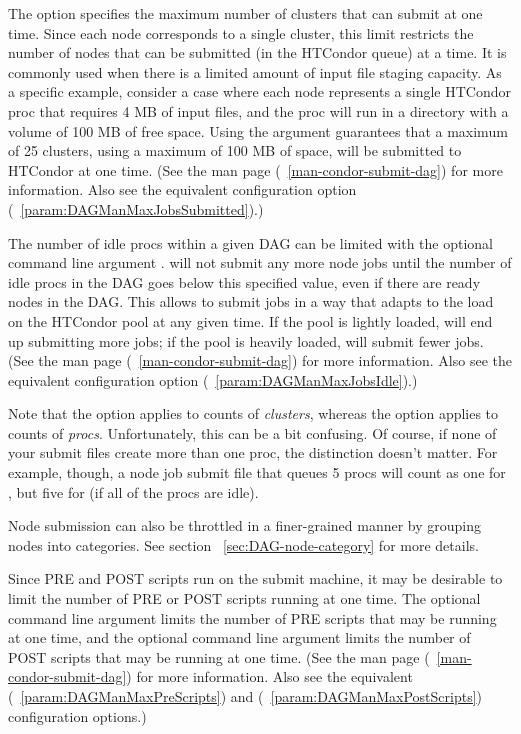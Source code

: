 The  option 
specifies the maximum number of clusters that 
can submit at one time.
Since each node corresponds to a single cluster,
this limit restricts the number of nodes that can be submitted (in the
HTCondor queue) at a time.
It is commonly used when
there is a limited amount of input file staging capacity.
As a specific example, consider a case where each node represents
a single HTCondor proc that requires 4 MB of input files,
and the proc will run in a directory with a volume of 100 MB
of free space.
Using the argument  guarantees that a maximum
of 25 clusters, using a maximum of 100 MB of space,
will be submitted to HTCondor at one time.
(See the  man page (~\ref{man-condor-submit-dag})
for more information.  Also see the equivalent
 configuration option
(~\ref{param:DAGManMaxJobsSubmitted}).)

The number of idle procs within a given DAG can be limited with
the optional command line argument . 
 will not submit any more node jobs 
until the number of idle procs in the DAG goes below this
specified value,
even if there are ready nodes in the DAG.
This allows  to submit jobs in a way that adapts to
the load on the HTCondor pool at any given time.  If the pool is
lightly loaded,  will end up submitting more jobs;
if the pool is heavily loaded,  will submit fewer jobs.
(See the  man page (~\ref{man-condor-submit-dag})
for more information.  Also see the equivalent
 configuration option
(~\ref{param:DAGManMaxJobsIdle}).)

Note that the  option applies to counts of
\emph{clusters}, whereas the  option
applies to counts of \emph{procs}.  Unfortunately, this can
be a bit confusing.  Of course, if none of your submit files
create more than one proc, the distinction doesn't matter.
For example, though, a node job submit file that queues
5 procs will count as one for , but five
for  (if all of the procs are idle).

Node submission can also be throttled in a finer-grained manner by
grouping nodes into categories.  See section ~\ref{sec:DAG-node-category}
for more details.

Since PRE and POST scripts run on the submit machine,
it may be desirable to limit the number of PRE or POST scripts running
at one time.
The optional  command line argument limits the number of PRE
scripts that may be running at one time,
and the optional  command line argument limits the number
of POST scripts that may be running at one time.
(See the  man page (~\ref{man-condor-submit-dag})
for more information.  Also see the equivalent
 (~\ref{param:DAGManMaxPreScripts}) and
 (~\ref{param:DAGManMaxPostScripts})
configuration options.)

